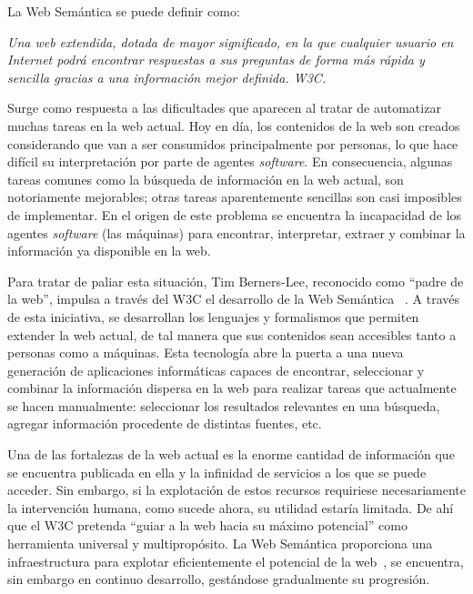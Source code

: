La Web Semántica se puede definir como: 
\begin{Frame}
\textit{Una web extendida, dotada de mayor significado, en la que cualquier
usuario en Internet podrá encontrar respuestas a sus preguntas de forma más rápida y
sencilla gracias a una información mejor definida. W3C.}
\end{Frame}

Surge como respuesta a las dificultades que aparecen al tratar de 
automatizar muchas tareas en la web actual. Hoy en día, los contenidos de la web son
creados considerando que van a ser consumidos principalmente por personas,
lo que hace difícil su interpretación por parte de agentes \textit{software}.
En consecuencia, algunas tareas comunes como la búsqueda de información en la web actual,
son notoriamente mejorables; otras tareas aparentemente sencillas son casi imposibles de implementar.
En el origen de este problema se encuentra la incapacidad de los agentes \textit{software} (las máquinas)
para encontrar, interpretar, extraer y combinar la información ya disponible en la web.


Para tratar de paliar esta situación, Tim Berners-Lee, reconocido como ``padre de la web'',
impulsa a través del \gls{W3C} el desarrollo de la Web Semántica ~\cite{WeavingTim,berners-lee06a}.
A través de esta iniciativa, se desarrollan los lenguajes y formalismos que permiten
extender la web actual, de tal manera que sus contenidos sean accesibles tanto a
personas como a máquinas. Esta tecnología abre la puerta a una nueva generación
de aplicaciones informáticas capaces de encontrar, seleccionar y combinar la
información dispersa en la web para realizar tareas que actualmente se hacen
manualmente: seleccionar los resultados relevantes en una búsqueda, agregar
información procedente de distintas fuentes, etc.


Una de las fortalezas de la web actual es la enorme cantidad de información que se encuentra
publicada en ella y la infinidad de servicios a los que se puede acceder.
Sin embargo, si la explotación de estos recursos requiriese necesariamente la intervención humana,
como sucede ahora, su utilidad estaría limitada. De ahí que el W3C pretenda
``guiar a la web hacia su máximo potencial'' como herramienta universal y multipropósito.
La Web Semántica proporciona una infraestructura para explotar eficientemente el potencial de
la web~\cite{Berendt02,decker00knowledge}, se encuentra, sin embargo en continuo desarrollo, gestándose gradualmente su progresión.

